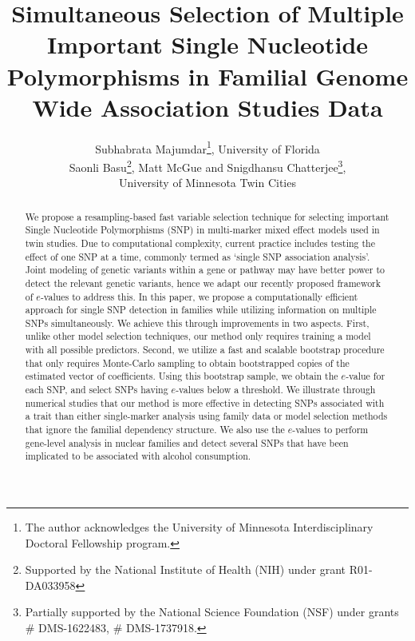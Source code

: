 \documentclass[11pt, letterpaper]{article}
\theoremstyle{definition}
\begin{document}
\def\spacingset#1{\renewcommand{\baselinestretch}%
{#1}\small\normalsize} \spacingset{1}

\title{{\bf Simultaneous Selection of Multiple Important Single Nucleotide Polymorphisms in Familial Genome Wide Association Studies Data}}
\author{Subhabrata Majumdar\thanks{
The author acknowledges the University of Minnesota  Interdisciplinary Doctoral Fellowship
program.}, University of Florida\\
Saonli Basu\thanks{Supported by the National Institute of Health (NIH) under grant R01-DA033958}, Matt McGue and Snigdhansu Chatterjee\thanks{
Partially  supported by the National Science Foundation (NSF) under grants \# DMS-1622483, \# DMS-1737918.}, \\
University of Minnesota Twin Cities}
\date{}
\maketitle

\begin{abstract}
We propose a resampling-based fast variable selection technique for selecting important Single Nucleotide Polymorphisms (SNP) in multi-marker mixed effect models used in twin studies. Due to computational complexity, current practice includes testing the effect of one SNP at a time, commonly termed as `single SNP association analysis'.  Joint modeling of genetic variants within a gene or pathway may have better power to detect the relevant genetic variants, hence we adapt our recently proposed framework of $e$-values to address this. In this paper, we propose a computationally efficient approach for single SNP detection in families while utilizing information on multiple SNPs simultaneously. We achieve this through improvements in two aspects. First, unlike other model selection techniques, our method only requires training a model with all possible predictors. Second, we utilize a fast and scalable bootstrap procedure that only requires Monte-Carlo sampling to obtain bootstrapped copies of the estimated vector of coefficients. Using this bootstrap sample, we obtain the $e$-value for each SNP, and select SNPs having $e$-values below a threshold. We illustrate through numerical studies that our method is more effective in detecting SNPs associated with a trait than either single-marker analysis using family data or model selection methods that ignore the familial dependency structure. We also use the $e$-values to perform gene-level analysis in nuclear families and detect several SNPs that have been implicated to be associated with alcohol consumption.
\end{abstract}
\end{document}
